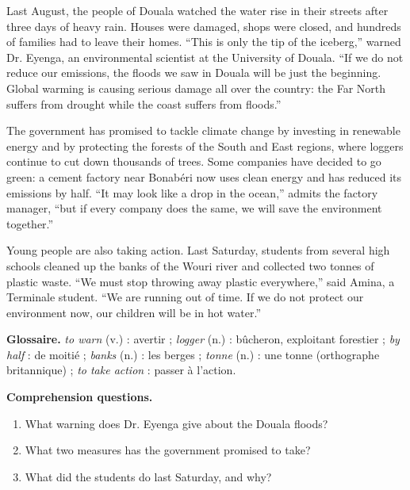 \documentclass[11pt]{article}
\begin{document}
\begin{textebox}
Last August, the people of Douala watched the water rise in their streets after three days of heavy rain. Houses were damaged, shops were closed, and hundreds of families had to leave their homes. “This is only the tip of the iceberg,” warned Dr. Eyenga, an environmental scientist at the University of Douala. “If we do not reduce our emissions, the floods we saw in Douala will be just the beginning. Global warming is causing serious damage all over the country: the Far North suffers from drought while the coast suffers from floods.”

The government has promised to tackle climate change by investing in renewable energy and by protecting the forests of the South and East regions, where loggers continue to cut down thousands of trees. Some companies have decided to go green: a cement factory near Bonabéri now uses clean energy and has reduced its emissions by half. “It may look like a drop in the ocean,” admits the factory manager, “but if every company does the same, we will save the environment together.”

Young people are also taking action. Last Saturday, students from several high schools cleaned up the banks of the Wouri river and collected two tonnes of plastic waste. “We must stop throwing away plastic everywhere,” said Amina, a Terminale student. “We are running out of time. If we do not protect our environment now, our children will be in hot water.”
\end{textebox}

\textbf{Glossaire.} \emph{to warn} (v.) : avertir ; \emph{logger} (n.) : bûcheron, exploitant forestier ; \emph{by half} : de moitié ; \emph{banks} (n.) : les berges ; \emph{tonne} (n.) : une tonne (orthographe britannique) ; \emph{to take action} : passer à l'action.

\textbf{Comprehension questions.}
\begin{enumerate}
\item What warning does Dr. Eyenga give about the Douala floods?
\item What two measures has the government promised to take?
\item What did the students do last Saturday, and why?
\end{enumerate}
\end{document}
